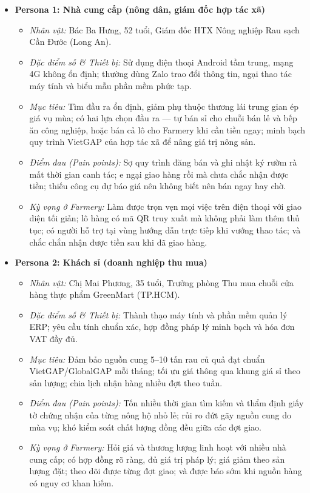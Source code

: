 \begin{itemize}
    \item \textbf{Persona 1: Nhà cung cấp (nông dân, giám đốc hợp tác xã)}
    \begin{itemize}
        \item \textit{Nhân vật:} Bác Ba Hưng, 52 tuổi, Giám đốc HTX Nông nghiệp Rau sạch Cần Đước (Long An).
        \item \textit{Đặc điểm số \& Thiết bị:} Sử dụng điện thoại Android tầm trung, mạng 4G không ổn định; thường dùng Zalo trao đổi thông tin, ngại thao tác máy tính và biểu mẫu phần mềm phức tạp.
        \item \textit{Mục tiêu:} Tìm đầu ra ổn định, giảm phụ thuộc thương lái trung gian ép giá vụ mùa; có hai lựa chọn đầu ra --- tự bán sỉ cho chuỗi bán lẻ và bếp ăn công nghiệp, hoặc bán cả lô cho Farmery khi cần tiền ngay; minh bạch quy trình VietGAP của hợp tác xã để nâng giá trị nông sản.
        \item \textit{Điểm đau (Pain points):} Sợ quy trình đăng bán và ghi nhật ký rườm rà mất thời gian canh tác; e ngại giao hàng rồi mà chưa chắc nhận được tiền; thiếu công cụ dự báo giá nên không biết nên bán ngay hay chờ.
        \item \textit{Kỳ vọng ở Farmery:} Làm được trọn vẹn mọi việc trên điện thoại với giao diện tối giản; lô hàng có mã QR truy xuất mà không phải làm thêm thủ tục; có người hỗ trợ tại vùng hướng dẫn trực tiếp khi vướng thao tác; và chắc chắn nhận được tiền sau khi đã giao hàng.
    \end{itemize}

    \item \textbf{Persona 2: Khách sỉ (doanh nghiệp thu mua)}
    \begin{itemize}
        \item \textit{Nhân vật:} Chị Mai Phương, 35 tuổi, Trưởng phòng Thu mua chuỗi cửa hàng thực phẩm GreenMart (TP.HCM).
        \item \textit{Đặc điểm số \& Thiết bị:} Thành thạo máy tính và phần mềm quản lý ERP; yêu cầu tính chuẩn xác, hợp đồng pháp lý minh bạch và hóa đơn VAT đầy đủ.
        \item \textit{Mục tiêu:} Đảm bảo nguồn cung 5--10 tấn rau củ quả đạt chuẩn VietGAP/GlobalGAP mỗi tháng; tối ưu giá thông qua khung giá sỉ theo sản lượng; chia lịch nhận hàng nhiều đợt theo tuần.
        \item \textit{Điểm đau (Pain points):} Tốn nhiều thời gian tìm kiếm và thẩm định giấy tờ chứng nhận của từng nông hộ nhỏ lẻ; rủi ro đứt gãy nguồn cung do mùa vụ; khó kiểm soát chất lượng đồng đều giữa các đợt giao.
        \item \textit{Kỳ vọng ở Farmery:} Hỏi giá và thương lượng linh hoạt với nhiều nhà cung cấp; có hợp đồng rõ ràng, đủ giá trị pháp lý; giá giảm theo sản lượng đặt; theo dõi được từng đợt giao; và được báo sớm khi nguồn hàng có nguy cơ khan hiếm.
    \end{itemize}


\end{itemize}
